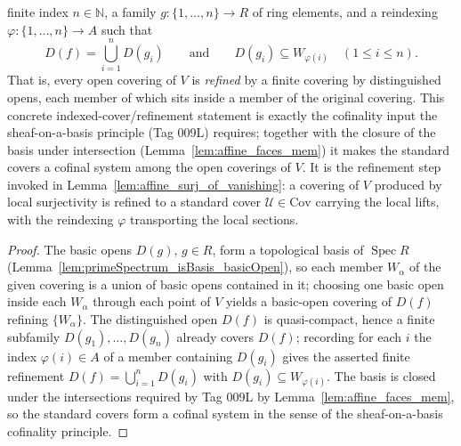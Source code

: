 \begin{lemma}
  finite index \(n \in \mathbb{N}\), a family \(g : \{1,\dots,n\} \to R\) of ring elements, and a
  reindexing \(\varphi : \{1,\dots,n\} \to A\) such that
  \[
    D(f) = \bigcup_{i=1}^n D(g_i)
    \qquad\text{and}\qquad
    D(g_i) \subseteq W_{\varphi(i)} \quad (1 \le i \le n).
  \]
  That is, every open covering of \(V\) is \emph{refined} by a finite covering by distinguished opens,
  each member of which sits inside a member of the original covering. This concrete
  indexed-cover/refinement statement is exactly the cofinality input the sheaf-on-a-basis principle
  (Tag 009L) requires; together with the closure of the basis under intersection
  (Lemma~\ref{lem:affine_faces_mem}) it makes the standard covers a cofinal system among the open
  coverings of \(V\). It is the refinement step invoked in
  Lemma~\ref{lem:affine_surj_of_vanishing}: a covering of \(V\) produced by local surjectivity is
  refined to a standard cover \(\mathcal{U} \in \mathrm{Cov}\) carrying the local lifts, with the
  reindexing \(\varphi\) transporting the local sections.
\end{lemma}
\begin{proof}
  \leanok
  The basic opens \(D(g)\), \(g \in R\), form a topological basis of \(\operatorname{Spec} R\)
  (Lemma~\ref{lem:primeSpectrum_isBasis_basicOpen}), so each member \(W_\alpha\) of the given covering
  is a union of basic opens contained in it; choosing one basic open inside each \(W_\alpha\) through
  each point of \(V\) yields a basic-open covering of \(D(f)\) refining \(\{W_\alpha\}\). The
  distinguished open \(D(f)\) is quasi-compact, hence a finite subfamily
  \(D(g_1), \dots, D(g_n)\) already covers \(D(f)\); recording for each \(i\) the index
  \(\varphi(i) \in A\) of a member containing \(D(g_i)\) gives the asserted finite refinement
  \(D(f) = \bigcup_{i=1}^n D(g_i)\) with \(D(g_i) \subseteq W_{\varphi(i)}\). The basis is closed
  under the intersections required by Tag 009L by Lemma~\ref{lem:affine_faces_mem}, so the standard
  covers form a cofinal system in the sense of the sheaf-on-a-basis cofinality principle.
\end{proof}

